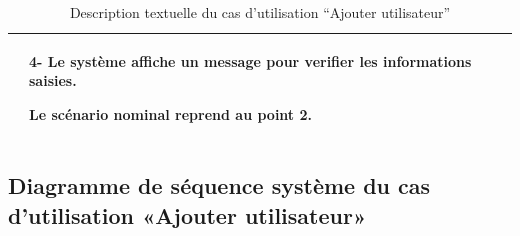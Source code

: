 \begin{table}[H]
  \centering
  \renewcommand{\arraystretch}{1.1}
  \begin{tabular}{|p{4cm}|p{9cm}|}

     & 4- Le système affiche un message pour verifier les informations saisies.\newline

    Le scénario nominal reprend au point 2.                                             \\

    \hline
  \end{tabular}
  \caption{Description textuelle du cas d’utilisation “Ajouter utilisateur”}



\end{table}


\subsection{Diagramme de séquence système du cas d’utilisation «Ajouter utilisateur»}

